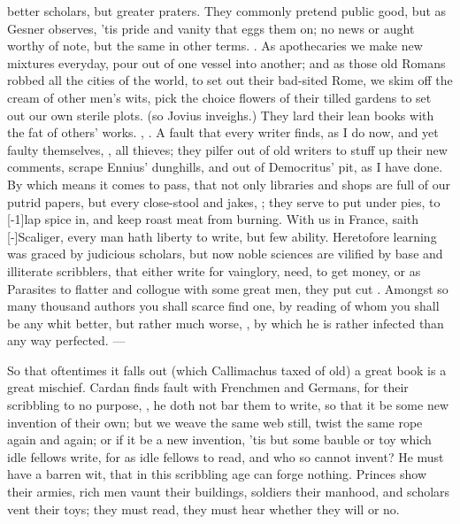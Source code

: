 {better scholars, but greater praters. They commonly pretend public
good, but as Gesner observes, 'tis pride and vanity that eggs them
on; no news or aught worthy of note, but the same in other terms. . As apothecaries we make new mixtures everyday, pour
out of one vessel into another; and as those old Romans robbed all the
cities of the world, to set out their bad-sited Rome, we skim off the
cream of other men's wits, pick the choice flowers of their tilled
gardens to set out our own sterile plots.  (so Jovius inveighs.) They
lard their lean books with the fat of others' works. ,
\etc. A fault that every writer finds, as I do now, and yet faulty
themselves, , all thieves; they pilfer out
of old writers to stuff up their new comments, scrape Ennius'
dunghills, and out of Democritus' pit, as I have done. By which
means it comes to pass, that not only libraries and shops are full
of our putrid papers, but every close-stool and jakes, ; they serve to put under pies, to [-1\baselineskip]lap spice
in, and keep roast meat from burning. With us in France, saith
[-\baselineskip]Scaliger, every man hath liberty to write, but few ability.
Heretofore learning was graced by judicious scholars, but now noble
sciences are vilified by base and illiterate scribblers, that either
write for vainglory, need, to get money, or as Parasites to flatter and
collogue with some great men, they put cut . Amongst so many thousand authors you shall scarce find
one, by reading of whom you shall be any whit better, but rather much
worse, , by which he is rather
infected than any way perfected.
---

So that oftentimes it falls out (which Callimachus taxed of old) a
great book is a great mischief. Cardan finds fault with Frenchmen
and Germans, for their scribbling to no purpose, , he doth not bar them to write,
so that it be some new invention of their own; but we weave the same
web still, twist the same rope again and again; or if it be a new
invention, 'tis but some bauble or toy which idle fellows write, for as
idle fellows to read, and who so cannot invent? He must have a
barren wit, that in this scribbling age can forge nothing. Princes
show their armies, rich men vaunt their buildings, soldiers their
manhood, and scholars vent their toys; they must read, they must hear
whether they will or no.

}
